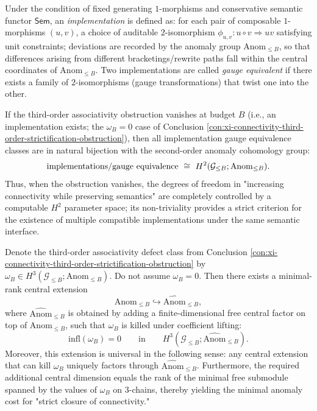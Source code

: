 \begin{conclusion}\label{con:xi-implementation-moduli-h2-anom}
Under the condition of fixed generating \(1\)-morphisms and conservative semantic functor \(\mathsf{Sem}\), an \emph{implementation} is defined as: for each pair of composable \(1\)-morphisms \((u,v)\), a choice of auditable \(2\)-isomorphism
\(
\phi_{u,v}:u\circ v\Rightarrow uv
\)
satisfying unit constraints; deviations are recorded by the anomaly group \(\mathrm{Anom}_{\le B}\), so that differences arising from different bracketings/rewrite paths fall within the central coordinates of \(\mathrm{Anom}_{\le B}\).
Two implementations are called \emph{gauge equivalent} if there exists a family of \(2\)-isomorphisms (gauge transformations) that twist one into the other.

If the third-order associativity obstruction vanishes at budget \(B\) (i.e., an implementation exists; the \(\omega_B=0\) case of Conclusion \ref{con:xi-connectivity-third-order-strictification-obstruction}), then all implementation gauge equivalence classes are in natural bijection with the second-order anomaly cohomology group:
\[
{\textup{implementations}}/{\textup{gauge equivalence}}\ \cong\ H^2(\mathcal{G}_{\le B};\mathrm{Anom}_{\le B}).
\]
Thus, when the obstruction vanishes, the degrees of freedom in "increasing connectivity while preserving semantics" are completely controlled by a computable \(H^2\) parameter space; its non-triviality provides a strict criterion for the existence of multiple compatible implementations under the same semantic interface.
\end{conclusion}

\begin{conclusion}\label{con:xi-minimal-central-extension-kill-omega}
Denote the third-order associativity defect class from Conclusion \ref{con:xi-connectivity-third-order-strictification-obstruction} by
\(
\omega_B\in H^3(\mathcal{G}_{\le B};\mathrm{Anom}_{\le B})
\).
Do not assume \(\omega_B=0\).
Then there exists a minimal-rank central extension
\[
\mathrm{Anom}_{\le B}\hookrightarrow \widehat{\mathrm{Anom}}_{\le B},
\]
where \(\widehat{\mathrm{Anom}}_{\le B}\) is obtained by adding a finite-dimensional free central factor on top of \(\mathrm{Anom}_{\le B}\), such that \(\omega_B\) is killed under coefficient lifting:
\[
\mathrm{infl}(\omega_B)=0\qquad\text{in}\qquad H^3(\mathcal{G}_{\le B};\widehat{\mathrm{Anom}}_{\le B}).
\]
Moreover, this extension is universal in the following sense: any central extension that can kill \(\omega_B\) uniquely factors through \(\widehat{\mathrm{Anom}}_{\le B}\).
Furthermore, the required additional central dimension equals the rank of the minimal free submodule spanned by the values of \(\omega_B\) on \(3\)-chains, thereby yielding the minimal anomaly cost for "strict closure of connectivity."
\end{conclusion}


